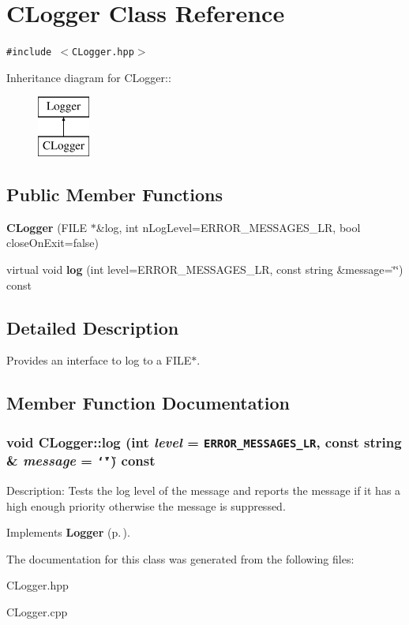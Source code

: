 \section{CLogger Class Reference}
\label{classCLogger}
{\tt \#include $<$CLogger.hpp$>$}

Inheritance diagram for CLogger::\begin{figure}[H]
\begin{center}
\leavevmode
\includegraphics[height=2cm]{classCLogger}
\end{center}
\end{figure}
\subsection*{Public Member Functions}
\begin{CompactItemize}
\item 
{\bf CLogger} (FILE $\ast$\&log, int n\-Log\-Level=ERROR\_\-MESSAGES\_\-LR, bool close\-On\-Exit=false)\label{classCLogger_a0}

\item 
virtual void {\bf log} (int level=ERROR\_\-MESSAGES\_\-LR, const string \&message=\char`\"{}\char`\"{}) const 
\end{CompactItemize}


\subsection{Detailed Description}
Provides an interface to log to a FILE$\ast$.



\subsection{Member Function Documentation}
\subsubsection{\setlength{\rightskip}{0pt plus 5cm}void CLogger::log (int {\em level} = {\tt ERROR\_\-MESSAGES\_\-LR}, const string \& {\em message} = {\tt \char`\"{}\char`\"{}}) const\hspace{0.3cm}{\tt  [virtual]}}\label{classCLogger_a2}


Description: Tests the log level of the message and reports the message if it has a high enough priority otherwise the message is suppressed.

Implements {\bf Logger} {\rm (p.\,\pageref{classLogger_a2})}.

The documentation for this class was generated from the following files:\begin{CompactItemize}
\item 
CLogger.hpp\item 
CLogger.cpp\end{CompactItemize}
